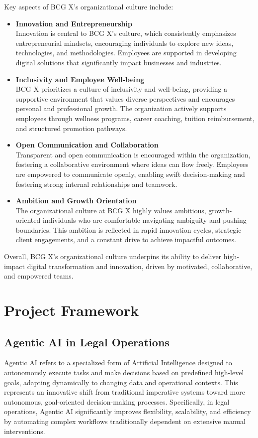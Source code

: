 Key aspects of BCG X’s organizational culture include:
\begin{itemize}
    \item \textbf{Innovation and Entrepreneurship }\\
        Innovation is central to BCG X's culture, which consistently emphasizes entrepreneurial mindsets, encouraging individuals to explore new ideas, technologies, and methodologies. Employees are supported in developing digital solutions that significantly impact businesses and industries.
    \item \textbf{Inclusivity and Employee Well-being }\\
        BCG X prioritizes a culture of inclusivity and well-being, providing a supportive environment that values diverse perspectives and encourages personal and professional growth. The organization actively supports employees through wellness programs, career coaching, tuition reimbursement, and structured promotion pathways.
    \item \textbf{Open Communication and Collaboration }\\
        Transparent and open communication is encouraged within the organization, fostering a collaborative environment where ideas can flow freely. Employees are empowered to communicate openly, enabling swift decision-making and fostering strong internal relationships and teamwork.
    \item \textbf{Ambition and Growth Orientation }\\
        The organizational culture at BCG X highly values ambitious, growth-oriented individuals who are comfortable navigating ambiguity and pushing boundaries. This ambition is reflected in rapid innovation cycles, strategic client engagements, and a constant drive to achieve impactful outcomes.
\end{itemize}

Overall, BCG X’s organizational culture underpins its ability to deliver high-impact digital transformation and innovation, driven by motivated, collaborative, and empowered teams.


\section{Project Framework}

\subsection{Agentic AI in Legal Operations}
Agentic AI refers to a specialized form of Artificial Intelligence designed to autonomously execute tasks and make decisions based on predefined high-level goals, adapting dynamically to changing data and operational contexts. This represents an innovative shift from traditional imperative systems toward more autonomous, goal-oriented decision-making processes. Specifically, in legal operations, Agentic AI significantly improves flexibility, scalability, and efficiency by automating complex workflows traditionally dependent on extensive manual interventions.\mynewline

